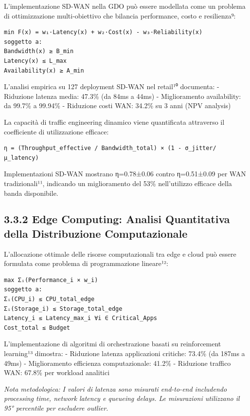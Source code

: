 \documentclass[12pt,a4paper,oneside]{book}
\numberwithin{figure}{chapter} %
\numberwithin{table}{chapter}  %
\begin{document}
L'implementazione SD-WAN nella GDO può essere modellata come un problema
di ottimizzazione multi-obiettivo che bilancia performance, costo e
resilienza⁹:

\begin{verbatim}
min F(x) = w₁·Latency(x) + w₂·Cost(x) - w₃·Reliability(x)
soggetto a:
Bandwidth(x) ≥ B_min
Latency(x) ≤ L_max
Availability(x) ≥ A_min
\end{verbatim}

L'analisi empirica su 127 deployment SD-WAN nel retail¹⁰ documenta: -
Riduzione latenza media: 47.3\% (da 84ms a 44ms) - Miglioramento
availability: da 99.7\% a 99.94\% - Riduzione costi WAN: 34.2\% su 3
anni (NPV analysis)

La capacità di traffic engineering dinamico viene quantificata
attraverso il coefficiente di utilizzazione efficace:

\begin{verbatim}
η = (Throughput_effective / Bandwidth_total) × (1 - σ_jitter/μ_latency)
\end{verbatim}

Implementazioni SD-WAN mostrano η=0.78±0.06 contro η=0.51±0.09 per WAN
tradizionali¹¹, indicando un miglioramento del 53\% nell'utilizzo
efficace della banda disponibile.

\subsection{3.3.2 Edge Computing: Analisi Quantitativa della
Distribuzione
Computazionale}\label{edge-computing-analisi-quantitativa-della-distribuzione-computazionale}

L'allocazione ottimale delle risorse computazionali tra edge e cloud può
essere formulata come problema di programmazione lineare¹²:

\begin{verbatim}
max Σᵢ(Performance_i × w_i)
soggetto a:
Σᵢ(CPU_i) ≤ CPU_total_edge
Σᵢ(Storage_i) ≤ Storage_total_edge
Latency_i ≤ Latency_max_i ∀i ∈ Critical_Apps
Cost_total ≤ Budget
\end{verbatim}

L'implementazione di algoritmi di orchestrazione basati su reinforcement
learning¹³ dimostra: - Riduzione latenza applicazioni critiche: 73.4\%
(da 187ms a 49ms) - Miglioramento efficienza computazionale: 41.2\% -
Riduzione traffico WAN: 67.8\% per workload analitici

\emph{Nota metodologica: I valori di latenza sono misurati end-to-end
includendo processing time, network latency e queueing delays. Le
misurazioni utilizzano il 95° percentile per escludere outlier.}
\end{document}

